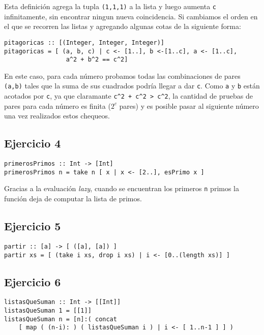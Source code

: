 Esta definición agrega la tupla \texttt{(1,1,1)} a la lista y luego aumenta \texttt{c} infinitamente, sin encontrar ningun nueva coincidencia. Si cambiamos el orden en el que se recorren las listas y agregando algunas cotas de la siguiente forma:
\begin{centrado}
\begin{verbatim}
pitagoricas :: [(Integer, Integer, Integer)]
pitagoricas = [ (a, b, c) | c <- [1..], b <-[1..c], a <- [1..c],
                 a^2 + b^2 == c^2]
\end{verbatim}
\end{centrado}
En este caso, para cada número probamos todas las combinaciones de pares \texttt{(a,b)} tales que la suma de sus cuadrados podría llegar a dar \texttt{c}. Como \texttt{a} y \texttt{b} están acotados por \texttt{c}, ya que claramante \texttt{c^2 + c^2 > c^2}, la cantidad de pruebas de pares para cada número es finita ($2^c$ pares) y es posible pasar al siguiente número una vez realizados estos chequeos.


\subsection{Ejercicio 4}
\begin{centrado}
\begin{verbatim}
primerosPrimos :: Int -> [Int]
primerosPrimos n = take n [ x | x <- [2..], esPrimo x ]
\end{verbatim}
\end{centrado}

Gracias a la evaluación \textit{lazy}, cuando se encuentran los primeros \texttt{n} primos la función deja de computar la lista de primos.

\subsection{Ejercicio 5}
\begin{centrado}
	\begin{verbatim}
partir :: [a] -> [ ([a], [a]) ]
partir xs = [ (take i xs, drop i xs) | i <- [0..(length xs)] ]
	\end{verbatim}
\end{centrado}

\subsection{Ejercicio 6}
\begin{centrado}
\begin{verbatim}
listasQueSuman :: Int -> [[Int]]
listasQueSuman 1 = [[1]]
listasQueSuman n = [n]:( concat 
	[ map ( (n-i): ) ( listasQueSuman i ) | i <- [ 1..n-1 ] ] ) 
\end{verbatim}
\end{centrado}


